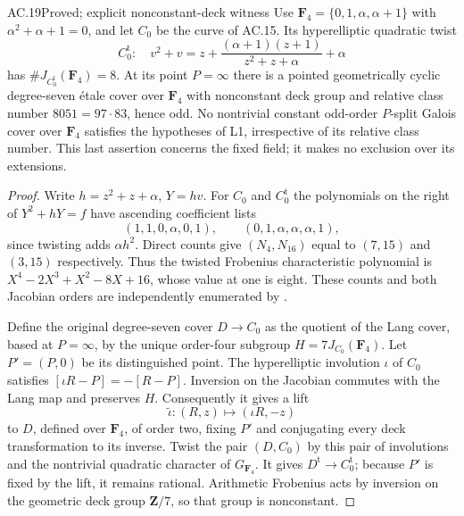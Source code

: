 \begin{claim}{AC.19}{Proved; explicit nonconstant-deck witness}
Use $\mathbf F_4=\{0,1,\alpha,\alpha+1\}$ with
$\alpha^2+\alpha+1=0$, and let $C_0$ be the curve of AC.15.
Its hyperelliptic quadratic twist
\[
 C_0^{\mathrm t}:\quad
 v^2+v=z+\frac{(\alpha+1)(z+1)}{z^2+z+\alpha}+\alpha
\]
has $\#J_{C_0^{\mathrm t}}(\mathbf F_4)=8$.
At its point $P=\infty$ there is a pointed geometrically cyclic
degree-seven \'etale cover over $\mathbf F_4$ with nonconstant deck
group and relative class number $8051=97\cdot83$, hence odd.
No nontrivial constant odd-order $P$-split Galois cover over
$\mathbf F_4$ satisfies the hypotheses of L1, irrespective of its
relative class number.  This last assertion concerns the fixed field;
it makes no exclusion over its extensions.
\end{claim}
\begin{proof}
Write $h=z^2+z+\alpha$, $Y=hv$.  For $C_0$ and $C_0^{\mathrm t}$ the
polynomials on the right of $Y^2+hY=f$ have ascending coefficient lists
\[
 (1,1,0,\alpha,0,1),\qquad
 (0,1,\alpha,\alpha,\alpha,1),
\]
since twisting adds $\alpha h^2$.  Direct counts give $(N_4,N_{16})$
equal to $(7,15)$ and $(3,15)$ respectively.  Thus the twisted
Frobenius characteristic polynomial is
$X^4-2X^3+X^2-8X+16$, whose value at one is eight.
These counts and both Jacobian orders are independently enumerated by
.

Define the original degree-seven cover $D\to C_0$ as the quotient of
the Lang cover, based at $P=\infty$, by the unique order-four subgroup
$H=7J_{C_0}(\mathbf F_4)$.  Let $P'=(P,0)$ be its distinguished point.
The hyperelliptic involution $\iota$ of $C_0$ satisfies
$[\iota R-P]=-[R-P]$.  Inversion on the Jacobian commutes with the Lang
map and preserves $H$.  Consequently it gives a lift
\[
                 \widetilde\iota:(R,z)\longmapsto(\iota R,-z)
\]
to $D$, defined over $\mathbf F_4$, of order two, fixing $P'$ and
conjugating every deck transformation to its inverse.
Twist the pair $(D,C_0)$ by this pair of involutions and the nontrivial
quadratic character of $G_{\mathbf F_4}$.  It gives
$D^{\mathrm t}\to C_0^{\mathrm t}$; because $P'$ is fixed by the lift,
it remains rational.  Arithmetic Frobenius acts by inversion on the
geometric deck group $\mathbf Z/7$, so that group is nonconstant.


\end{proof}
